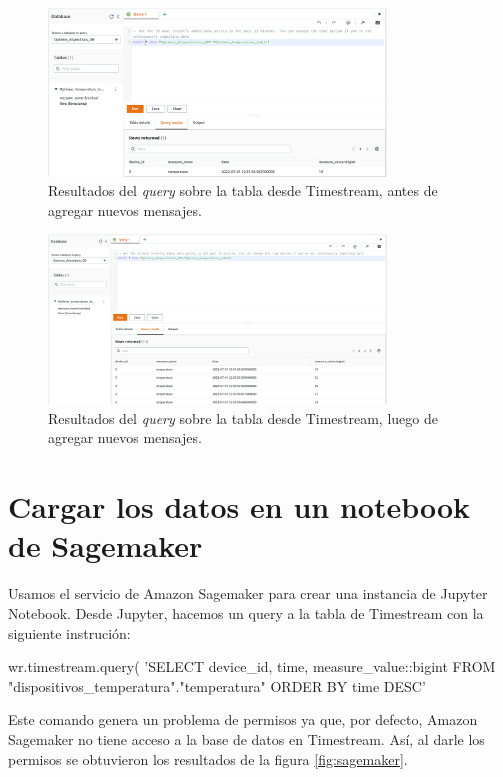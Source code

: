 \documentclass[10pt]{article}
\begin{document}
\begin{figure}[H]
    \centering
    \includegraphics[width=0.8\textwidth]{Images/AWS_console_DB_query.png}
    \caption{Resultados del \textit{query} sobre la tabla desde Timestream, antes de agregar nuevos mensajes.}
    \label{fig:query1}
\end{figure}

\begin{figure}[H]
    \centering
    \includegraphics[width=0.8\textwidth]{Images/AWS_console_query_after_from_device.png}
    \caption{Resultados del \textit{query} sobre la tabla desde Timestream, luego de agregar nuevos mensajes.}
    \label{fig:query2}
\end{figure}

\section{Cargar los datos en un notebook de Sagemaker}

Usamos el servicio de Amazon Sagemaker para crear una instancia de Jupyter Notebook. Desde Jupyter, hacemos un query a la tabla de Timestream con la siguiente instrución:

\begin{center}
wr.timestream.query(
    'SELECT device\_id, time, measure\_value::bigint FROM "dispositivos\_temperatura"."temperatura" ORDER BY time DESC'
\end{center}

Este comando genera un problema de permisos ya que, por defecto, Amazon Sagemaker no tiene acceso a la base de datos en Timestream. Así, al darle los permisos se obtuvieron los resultados de la figura \ref{fig:sagemaker}.
\end{document}
